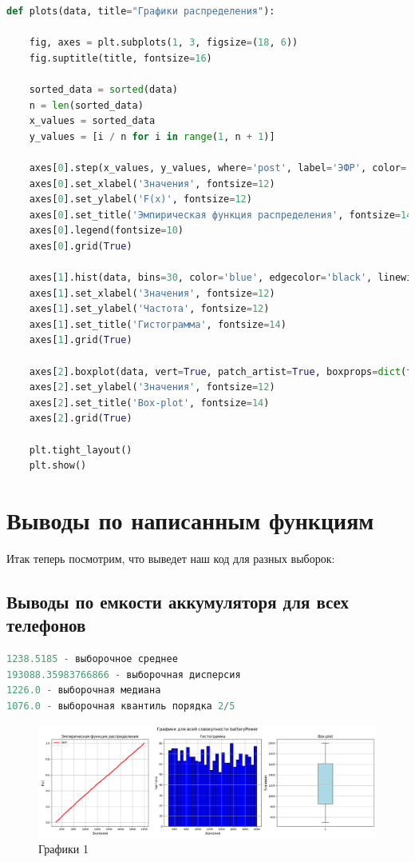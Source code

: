 \documentclass[14pt]{extreport}
\begin{document}
\begin{lstlisting}[language=Python, caption={Графики распределения}]
def plots(data, title="Графики распределения"):

    fig, axes = plt.subplots(1, 3, figsize=(18, 6))
    fig.suptitle(title, fontsize=16)

    sorted_data = sorted(data)
    n = len(sorted_data)
    x_values = sorted_data
    y_values = [i / n for i in range(1, n + 1)]
    
    axes[0].step(x_values, y_values, where='post', label='ЭФР', color='red', linewidth=2.5)
    axes[0].set_xlabel('Значения', fontsize=12)
    axes[0].set_ylabel('F(x)', fontsize=12)
    axes[0].set_title('Эмпирическая функция распределения', fontsize=14)
    axes[0].legend(fontsize=10)
    axes[0].grid(True)

    axes[1].hist(data, bins=30, color='blue', edgecolor='black', linewidth=1.5)
    axes[1].set_xlabel('Значения', fontsize=12)
    axes[1].set_ylabel('Частота', fontsize=12)
    axes[1].set_title('Гистограмма', fontsize=14)
    axes[1].grid(True)

    axes[2].boxplot(data, vert=True, patch_artist=True, boxprops=dict(facecolor="lightblue"))
    axes[2].set_ylabel('Значения', fontsize=12)
    axes[2].set_title('Box-plot', fontsize=14)
    axes[2].grid(True)
    
    plt.tight_layout()
    plt.show()
\end{lstlisting}

\section{Выводы по написанным функциям}
Итак теперь посмотрим, что выведет наш код для разных выборок:

\subsection*{Выводы по емкости аккумуляторя для всех телефонов}

\begin{lstlisting}[language=Python, caption={Вывод 1}]
1238.5185 - выборочное среднее
193088.35983766866 - выборочная дисперсия
1226.0 - выборочная медиана
1076.0 - выборочная квантиль порядка 2/5
\end{lstlisting}

\begin{figure}[H]
    \centering
    \includegraphics[width=1\linewidth]{Figure_1.png}
    \caption{Графики 1}
\end{figure}
\end{document}
